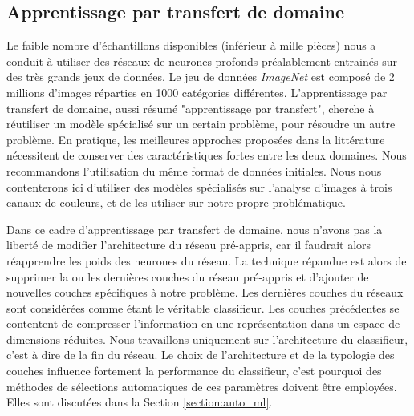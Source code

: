 \subsection{Apprentissage par transfert de domaine} \label{subsec:transfer_learning}

Le faible nombre d'échantillons disponibles (inférieur à mille pièces) nous a conduit à utiliser des réseaux de neurones profonds préalablement entrainés sur des très grands jeux de données.
Le jeu de données \textit{ImageNet} \cite{deng_imagenet_2009} est composé de 2 millions d'images réparties en 1000 catégories différentes.
L'apprentissage par transfert de domaine, aussi résumé "apprentissage par transfert", cherche à réutiliser un modèle spécialisé sur un certain problème, pour résoudre un autre problème.
En pratique, les meilleures approches proposées dans la littérature nécessitent de conserver des caractéristiques fortes entre les deux domaines.
Nous recommandons l'utilisation du même format de données initiales.
Nous nous contenterons ici d'utiliser des modèles spécialisés sur l'analyse d'images à trois canaux de couleurs, et de les utiliser sur notre propre problématique.

Dans ce cadre d'apprentissage par transfert de domaine, nous n'avons pas la liberté de modifier l'architecture du réseau pré-appris, car il faudrait alors réapprendre les poids des neurones du réseau.
La technique répandue est alors de supprimer la ou les dernières couches du réseau pré-appris et d'ajouter de nouvelles couches spécifiques à notre problème.
Les dernières couches du réseaux sont considérées comme étant le véritable classifieur.
Les couches précédentes se contentent de compresser l'information en une représentation dans un espace de dimensions réduites.
Nous travaillons uniquement sur l'architecture du classifieur, c'est à dire de la fin du réseau.
Le choix de l'architecture et de la typologie des couches influence fortement la performance du classifieur, c'est pourquoi des méthodes de sélections automatiques de ces paramètres doivent être employées.
Elles sont discutées dans la Section \ref{section:auto_ml}.

